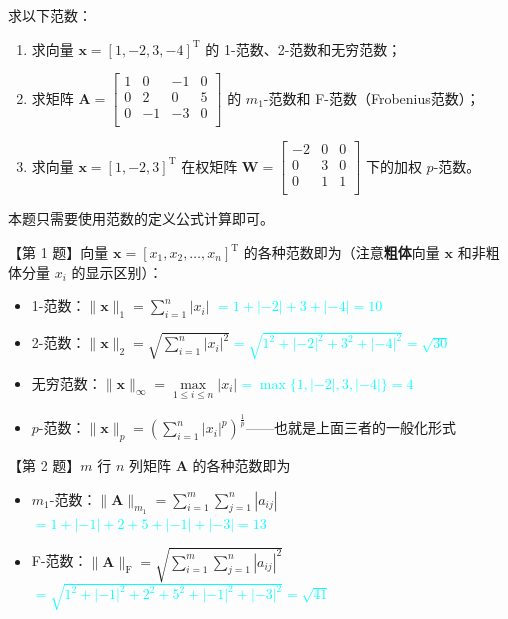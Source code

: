 \documentclass[UTF8]{ctexart}
\newcommand\x{\boldsymbol{x}}
\newcommand\A{\boldsymbol{A}}
\newcommand\W{\boldsymbol{W}}
\begin{document}
{\color{cyan!50!black}
求以下范数：

\begin{enumerate}[itemsep=0pt,parsep=0pt]
    \item 求向量 $\x = [1,-2,3,-4]^{\mathrm{T}}$ 的 1-范数、2-范数和无穷范数；
    \item 求矩阵 $\A = \begin{bmatrix}
                      1 & 0 & -1 & 0 \\
                      0 & 2 & 0 & 5\\
                      0 & -1 & -3 & 0\\
                    \end{bmatrix}$ 的 $m_1$-范数和 F-范数（Frobenius范数）；
    \item 求向量 $\x = [1,-2,3]^{\mathrm{T}}$ 在权矩阵 $\W = \begin{bmatrix}
                                                        -2 & 0 & 0 \\
                                                        0 & 3 & 0 \\
                                                        0 & 1 & 1 \\
                                                      \end{bmatrix}$ 下的加权 $p$-范数。
\end{enumerate}

}

本题只需要使用范数的定义公式计算即可。

【第 1 题】向量 $\x = [x_1,x_2,\dots,x_n]^{\mathrm{T}}$ 的各种范数即为（注意\textbf{粗体}向量 $\x$ 和非粗体分量 $x_i$ 的显示区别）：
\begin{itemize}
  \item 1-范数：$\|\x\|_1 = \sum\limits_{i=1}^n |x_i| $ \textcolor{cyan}{$= 1+|-2|+3+|-4|=10$}
  \item 2-范数：$\|\x\|_2 = \sqrt{\sum\limits_{i=1}^n |x_i|^2} $\textcolor{cyan}{$= \sqrt{1^2 + |-2|^2 + 3^2 + |-4|^2} = \sqrt{30}$}
  \item 无穷范数：$\|\x\|_\infty = \max\limits_{1\leqslant i\leqslant n} |x_i| $\textcolor{cyan}{$= \max\{1,|-2|,3,|-4|\} = 4$}
  \item $p$-范数：$\|\x\|_p = \left(\sum\limits_{i=1}^n |x_i|^p\right)^{\frac{1}{p}}$——也就是上面三者的一般化形式
\end{itemize}

【第 2 题】$m$ 行 $n$ 列矩阵 $\A$ 的各种范数即为
\begin{itemize}
  \item $m_1$-范数：$\|\A\|_{m_1} = \sum\limits_{i=1}^m \sum\limits_{j=1}^n  |a_{ij}| $ \textcolor{cyan}{$=1 + |-1| + 2 + 5 + |-1| + |-3| = 13$}
  \item F-范数：$\|\A\|_{\mathrm{F}} = \sqrt{\sum\limits_{i=1}^m \sum\limits_{j=1}^n  |a_{ij}|^2} $ \textcolor{cyan}{$= \sqrt{1^2 + |-1|^2 + 2^2 + 5^2 + |-1|^2 + |-3|^2} = \sqrt{41}$}
\end{itemize}
\end{document}
